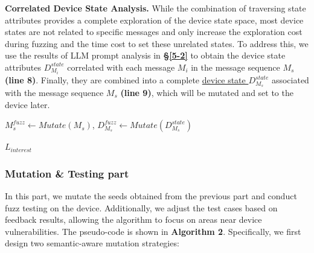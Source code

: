 \documentclass[10pt,journal,compsoc]{IEEEtran}
\begin{document}
\textbf{Correlated Device State Analysis.} While the combination of traversing state attributes provides a complete exploration of the device state space, most device states are not related to specific messages and only increase the exploration cost during fuzzing and the time cost to set these unrelated states. To address this, we use the results of LLM prompt analysis in \textbf{\S\ref{5-2}} to obtain the device state attributes $D_{M_i}^{state}$ correlated with each message $M_i$ in the message sequence $M_s$ \textbf{(line 8)}. Finally, they are combined into a complete \underline{device state $D_{M_{s}}^{state}$} associated with the message sequence $M_s$ \textbf{(line 9)}, which will be mutated and set to the device later. 

\begin{algorithm}[t]
        \caption{Fuzzing Algorithm(Mutation \& Testing Part).}\label{alg:2}
        $ M_{s}^{fuzz} \gets Mutate(M_{s})$, $ D_{M_{s}}^{fuzz} \gets Mutate(D_{M_{s}}^{state})$\\
        
        \Return $L_{interest}$
\end{algorithm}
\vspace{-0.5em}

\subsubsection{Mutation \& Testing part} 
In this part, we mutate the seeds obtained from the previous part and conduct fuzz testing on the device. Additionally, we adjust the test cases based on feedback results, allowing the algorithm to focus on areas near device vulnerabilities. The pseudo-code is shown in \textbf{Algorithm 2}. Specifically, we first design two semantic-aware mutation strategies:
\end{document}
